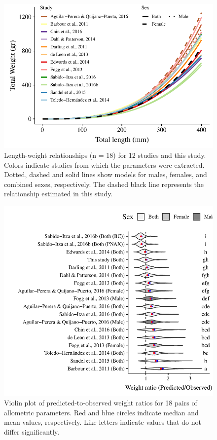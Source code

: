 \documentclass[12pt,]{article}
\theoremstyle{definition}
\theoremstyle{definition}
\theoremstyle{definition}
\theoremstyle{remark}
\begin{document}
\begin{figure}
\centering
\includegraphics{Manuscript_files/figure-latex/unnamed-chunk-12-1.pdf}
\caption{\label{fig:unnamed-chunk-12}\label{fig:all_allo}Length-weight
relationships (n = 18) for 12 studies and this study. Colors indicate
studies from which the parameters were extracted. Dotted, dashed and
solid lines show models for males, females, and combined sexes,
respectively. The dashed black line represents the relationship
estimated in this study.}
\end{figure}

\begin{figure}
\centering
\includegraphics{Manuscript_files/figure-latex/unnamed-chunk-13-1.pdf}
\caption{\label{fig:unnamed-chunk-13}\label{fig:bio_ratio}Violin plot of
predicted-to-observed weight ratios for 18 pairs of allometric
parameters. Red and blue circles indicate median and mean values,
respectively. Like letters indicate values that do not differ
significantly.}
\end{figure}
\end{document}
